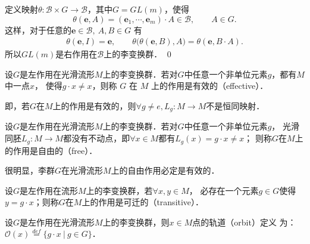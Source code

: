 定义映射$\theta: \mathscr{B} \times G \rightarrow \mathscr{B}$，其中$G=GL(m)$，使得
\begin{equation*}
    \theta(\boldsymbol{e}, A)=\left(\boldsymbol{e}_1, \cdots, 
    \boldsymbol{e}_m\right) \cdot A \in \mathscr{B},\qquad A\in G .
\end{equation*}
这样，对于任意的$\boldsymbol{e} \in \mathscr{B},\ A, B \in G$ 有
\begin{align*}
    \theta(\boldsymbol{e}, I) =\boldsymbol{e}, \qquad
    \theta\bigl(\theta(\boldsymbol{e}, B), A\bigr)  
    =\theta(\boldsymbol{e}, B \cdot A).
\end{align*}
所以$GL(m)$是右作用在$\mathscr{B}$上的李变换群．
\qed


\begin{definition}
    设$G$是左作用在光滑流形$M$上的李变换群．若对$G$中任意一个非单位元素$g$，都有$M$中一点$x$，
    使得$g \cdot x \neq x$，则称 $G$ 在 $M$ 上的作用是{\heiti  有效的}（effective）．
\end{definition}

即，若$G$在$M$上的作用是有效的，则$\forall g \neq e, L_{g}: M \rightarrow M$不是恒同映射．


\begin{definition}
    设$G$是左作用在光滑流形$M$上的李变换群．若对$G$中任意一个非单位元素$g$，
    光滑同胚$L_g: M \rightarrow M$都没有不动点，即$\forall x \in M$都有$L_g(x)=g \cdot x \neq x$；
    则称$G$在$M$上的作用是{\heiti 自由的}（free）．
\end{definition}


很明显，李群$G$在光滑流形$M$上的自由作用必定是有效的． 


\begin{definition}
    设$G$是左作用在流形$M$上的李变换群，若$\forall x, y \in M$，
    必存在一个元素$g \in G$使得$y=g \cdot x$；则称$G$在$M$上的作用是{\heiti 可迁的}（transitive）．    
\end{definition}



\begin{definition}
    设$G$是左作用在光滑流形$M$上的李变换群，则$x \in M$点的{\heiti 轨道}（orbit）定义
    为：$\mathcal{O}(x) \overset{def}{=} \{ g\cdot x \ | \  g\in G \}$．
\end{definition}

